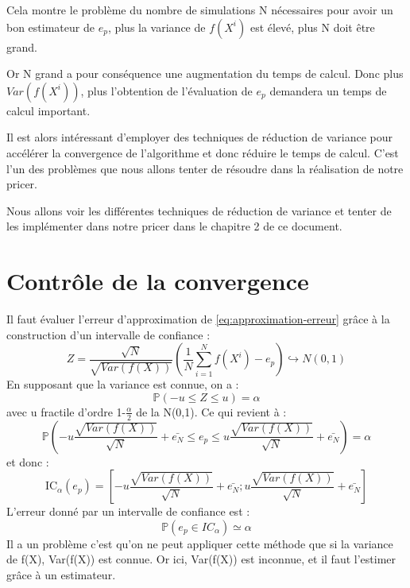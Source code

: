 \documentclass[12pt]{report}
\begin{document}
Cela montre le problème du nombre de simulations N nécessaires pour avoir un bon estimateur de $e_p$, plus la variance de $f(X^i)$ est élevé, plus N doit être grand.

Or N grand a pour conséquence une augmentation du temps de calcul. Donc plus $Var(f(X^i))$, plus l’obtention de l’évaluation de $e_p$ demandera un temps de calcul important.

Il est alors intéressant d’employer des techniques de réduction de variance pour accélérer la convergence de l’algorithme et donc réduire le temps de calcul. C’est l’un des problèmes que nous allons tenter de résoudre dans la réalisation de notre pricer.

Nous allons voir les différentes techniques de réduction de variance et tenter de les implémenter dans notre pricer dans le chapitre 2 de ce document.

\section{Contrôle de la convergence}

Il faut évaluer l’erreur d’approximation de \eqref{eq:approximation-erreur}  grâce à la construction d’un intervalle de confiance :
\begin{equation}
	Z = \frac{\sqrt{N}}{\sqrt{Var(f(X))}} (\frac{1}{N}\sum_{i=1}^{N}f(X^i)-e_p)\hookrightarrow N(0,1)
\end{equation}
En supposant que la variance est connue, on a :
\begin{equation}
	\mathbb{P}(-u\leq Z \leq u) = \alpha
\end{equation}
avec u fractile d'ordre 1-$\frac{\alpha}{2}$ de la N(0,1). Ce qui revient à :
\begin{equation}
	\mathbb{P}(-u \frac{\sqrt{Var(f(X))}}{\sqrt{N}}+\bar{e_N}\leq e_p \leq u \frac{\sqrt{Var(f(X))}}{\sqrt{N}}+\bar{e_N}) = \alpha
\end{equation}
et donc :
\begin{equation}
	\text{IC}_\alpha(e_p) = [-u \frac{\sqrt{Var(f(X))}}{\sqrt{N}}+\bar{e_N};u \frac{\sqrt{Var(f(X))}}{\sqrt{N}}+\bar{e_N}]
\end{equation}
L’erreur donné par un intervalle de confiance est :
\begin{equation}
	\mathbb{P}(e_p\in IC_\alpha ) \simeq \alpha
\end{equation}
Il a un problème c’est qu’on ne peut appliquer cette méthode que si la variance de f(X), Var(f(X)) est connue. Or ici, Var(f(X)) est inconnue, et il faut l’estimer grâce à un estimateur.
\end{document}
